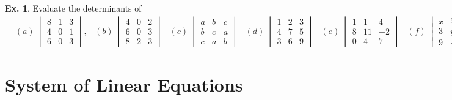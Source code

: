 \documentclass[10pt,a4paper]{book}
\theoremstyle{definition}\newtheorem{definition}{Definition}
\theoremstyle{definition}\newtheorem{fact}{Fact}
\theoremstyle{definition}\newtheorem{ex}{Ex.}
\theoremstyle{definition}\newtheorem{project}{Project}
\theoremstyle{definition}\newtheorem{problem}{Problem}
\theoremstyle{definition}\newtheorem{example}{Example}
\numberwithin{theorem}{chapter}
\numberwithin{corollary}{chapter}
\numberwithin{assumption}{chapter}
\numberwithin{definition}{chapter}
\numberwithin{prop}{chapter}
\numberwithin{notation}{chapter}
\numberwithin{problem}{chapter}
\numberwithin{example}{chapter}
\numberwithin{fact}{chapter}
\numberwithin{ex}{chapter}
\begin{document}
	
	\begin{ex}
		Evaluate the determinants of
		\begin{align*}
			&(a) \ \begin{vmatrix}
				8 & 1  & 3  \\
				4 & 0  & 1  \\
				6 & 0  & 3  
			\end{vmatrix}, 
			&(b) \ \begin{vmatrix}
				4 & 0  & 2  \\
				6 & 0  & 3  \\
				8 & 2  & 3  
			\end{vmatrix}
			&(c) \ \begin{vmatrix}
				a & b  & c  \\
				b & c  & a  \\
				c & a  & b  
			\end{vmatrix}
			&(d) \ \begin{vmatrix}
				1 & 2  & 3  \\
				4 & 7  & 5  \\
				3 & 6  & 9  
			\end{vmatrix}
			&(e) \ \begin{vmatrix}
				1 & 1  & 4  \\
				8 & 11 & -2 \\
				0 & 4  & 7  
			\end{vmatrix}
			&(f) \ \begin{vmatrix}
				x & 5  & 0  \\
				3 & y  & 2  \\
				9 & -1 & 8  
			\end{vmatrix}
		\end{align*}
	\end{ex}

	
	\section{System of Linear Equations}
	
\end{document}
